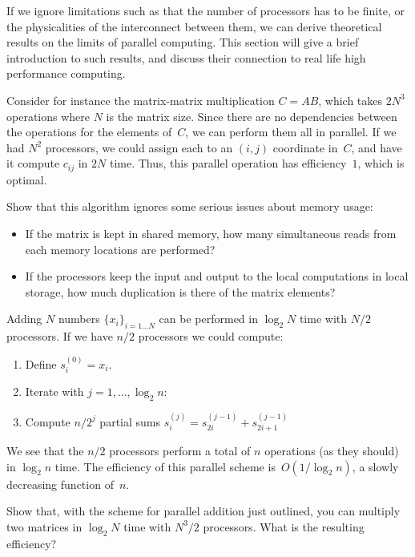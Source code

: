
If we ignore limitations such as that the number of processors has to
be finite, or the physicalities of the  interconnect between them, we can
derive theoretical results on the limits of parallel computing. This
section will give a brief introduction to such results, and discuss
their connection to real life high performance computing.

Consider for instance the matrix-matrix multiplication
$C=AB$, which takes $2N^3$ operations where $N$ is the matrix
size. Since there are no dependencies between the operations for the
elements of~$C$, we can perform them all in parallel. If we had $N^2$
processors, we could assign each to an $(i,j)$ coordinate in~$C$, and
have it compute $c_{ij}$ in $2N$ time. Thus, this parallel operation
has efficiency~$1$, which is optimal.

\begin{exercise}
  Show that this algorithm ignores some serious issues about memory
  usage:
  \begin{itemize}
  \item If the matrix is kept in shared memory, how many simultaneous
    reads from each memory locations are performed?
  \item If the processors keep the input and output to the local
    computations in  local storage, how much duplication
    is there of the matrix elements?
  \end{itemize}
\end{exercise}

Adding $N$ numbers $\{x_i\}_{i=1\ldots N}$ can be performed in
$\log_2 N$ time with $N/2$ processors.
If we have $n/2$ processors we
could compute:
\begin{enumerate}
\item Define $s^{(0)}_i = x_i$.
\item Iterate with $j=1,\ldots,\log_2 n$:
\item Compute $n/2^j$ partial sums $s^{(j)}_i=s^{(j-1)}_{2i}+s^{(j-1)}_{2i+1}$
\end{enumerate}
We see that the $n/2$ processors perform a total of $n$ operations (as
they should) in $\log_2n$ time. The efficiency of this parallel scheme
is~$O(1/\log_2n)$, a slowly decreasing function of~$n$.  
\begin{exercise}
  Show that, with the scheme for parallel addition just outlined, you
  can multiply two matrices in $\log_2 N$ time with $N^3/2$
  processors. What is the resulting efficiency?
\end{exercise}

